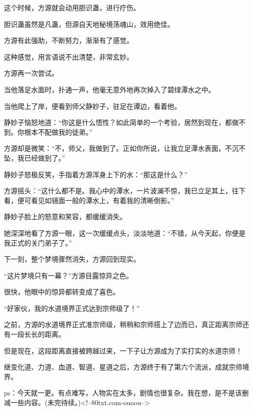 \begin{this_body}
这个时候，方源就会动用胆识蛊，进行疗伤。

胆识蛊虽然是凡蛊，但源自天地秘境荡魂山，效用绝佳。

方源有此强助，不断努力，渐渐有了感觉。

这种感觉，用言语说不出清楚，非常玄妙。

方源再一次尝试。

当他落足水面时，扑通一声，他毫无意外地再次掉入了碧绿潭水之中。

当他爬上了岸，便看到师父静妙子，驻足在谭边，看着他。

静妙子恼怒地道：“你这是什么悟性？如此简单的一个考验，居然到现在，都做不到。你根本不配做我的徒弟。”

方源却是微笑：“不，师父，我做到了。正如你所说，让我立足潭水表面，不沉不坠，我已经做到了。”

静妙子怒极反笑，手指着方源浑身上下的水：“那这是什么？”

方源摇头：“这什么都不是。我心中的潭水，一片波澜不惊，我已立足其上，往下看，便可看见如镜面一般的潭水上，有着我的清晰倒影。”

静妙子脸上的怒意和笑容，都缓缓消失。

她深深地看了方源一眼，这一次缓缓点头，淡淡地道：“不错，从今天起，你便是我正式的关门弟子了。”

下一刻，整个梦境骤然消失，方源回到现实。

“这片梦境只有一幕？”方源目露惊异之色。

很快，他眼中的惊异都转变成了喜色。

“好家伙，我的水道境界正式达到宗师级了！”

之前，方源的水道境界正式准宗师级，稍稍和宗师搭上了边而已，真正距离宗师还有一段长长的距离。

但是现在，这段距离直接被跨越过来，一下子让方源成为了实打实的水道宗师！

继变化道、力道、血道、智道、星道之后，方源终于有了第六个流派，成就宗师境界。

ps：今天就一更。有点难写，人物实在太多，剧情也很复杂。我在想，是不是该删减一些内容。(未完待续。)<!--80txt.com-ouoou-->

\end{this_body}

